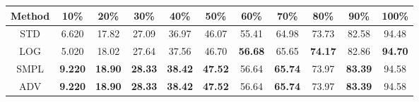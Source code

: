 \documentclass{standalone}
\begin{document}
\begin{tabular}{c|cccccccccc}
      \toprule
      Method & 10\% & 20\% & 30\% & 40\% & 50\% & 60\% & 70\% & 80\% & 90\% & 100\% \\
      \midrule
STD & 6.620 & 17.82 & 27.09 & 36.97 & 46.07 & 55.41 & 64.98 & 73.73 & 82.58 & 94.48\\
LOG & 5.020 & 18.02 & 27.64 & 37.56 & 46.70 & \textbf{56.68} & 65.65 & \textbf{74.17} & 82.86 & \textbf{94.70}\\
SMPL & \textbf{9.220} & \textbf{18.90} & \textbf{28.33} & \textbf{38.42} & \textbf{47.52} & 56.64 & \textbf{65.74} & 73.97 & \textbf{83.39} & 94.58\\
ADV & \textbf{9.220} & \textbf{18.90} & \textbf{28.33} & \textbf{38.42} & \textbf{47.52} & 56.64 & \textbf{65.74} & 73.97 & \textbf{83.39} & 94.58\\
  \bottomrule
\end{tabular}
\end{document}
